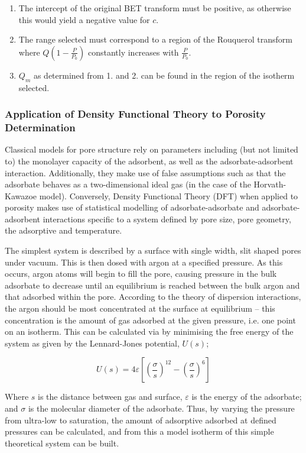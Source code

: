 	\begin{enumerate}
		\item The intercept of the original BET transform must be positive, as otherwise this would yield a negative value for $c$.
		\item The range selected must correspond to a region of the Rouquerol transform where $Q \left(1 - \frac{P}{P_0} \right)$ constantly increases with $\frac{P}{P_0}$.
		\item $Q_m$ as determined from 1. and 2. can be found in the region of the isotherm selected.\citep{Rouquerol2007Is} 
	\end{enumerate}

\subsubsection{Application of Density Functional Theory to Porosity Determination}

Classical models for pore structure rely on parameters including (but not limited to) the monolayer capacity of the adsorbent, as well as the adsorbate-adsorbent interaction. Additionally, they make use of false assumptions such as that the adsorbate behaves as a two-dimensional ideal gas (in the case of the Horvath-Kawazoe model). Conversely, Density Functional Theory (DFT) when applied to porosity makes use of statistical modelling of adsorbate-adsorbate and adsorbate-adsorbent interactions specific to a system defined by pore size, pore geometry, the adsorptive and temperature.

The simplest system is described by a surface with single width, slit shaped pores under vacuum. This is then dosed with argon at a specified pressure. As this occurs, argon atoms will begin to fill the pore, causing pressure in the bulk adsorbate to decrease until an equilibrium is reached between the bulk argon and that adsorbed within the pore. According to the theory of dispersion interactions, the argon should be most concentrated at the surface at equilibrium – this concentration is the amount of gas adsorbed at the given pressure, i.e. one point on an isotherm. This can be calculated via by minimising the free energy of the system as given by the Lennard-Jones potential, $U(s)$;

\begin{equation}
U(s) = 4\varepsilon \left[ \left(\frac{\sigma}{s}\right)^{12} -  \left(\frac{\sigma}{s}\right)^{6} \right]
\end{equation}

Where $s$ is the distance between gas and surface, $\varepsilon$ is the energy of the adsorbate; and $\sigma$ is the molecular diameter of the adsorbate.  Thus, by varying the pressure from ultra-low to saturation, the amount of adsorptive adsorbed at defined pressures can be calculated, and from this a model isotherm of this simple theoretical system can be built. 

